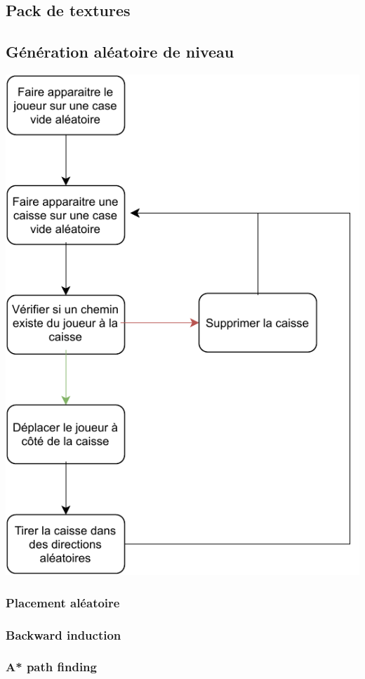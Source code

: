 \documentclass[../main.tex]{subfiles}
\begin{document}
\subsection{Pack de textures}

\subsection{Génération aléatoire de niveau}
\includegraphics[width=1\textwidth]{images/generation.pdf}
\subsubsection{Placement aléatoire}
\subsubsection{Backward induction}
\subsubsection{A* path finding}
\end{document}
